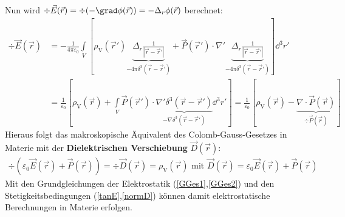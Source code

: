 		    Nun wird $\div \vec{E}(\vec{r} ) = \div (-\grad \phi(\vec{r} )) = -\Delta _r \phi(\vec{r} )$ berechnet:
		        \begin{equation}\begin{split}
				        \div \vec{E}(\vec{r} ) & = - \frac{1}{4\pi\varepsilon_0} \int\limits_V [ \rho_\text{V}(\vec{r}' ) \underbrace{\Delta _r\frac{1}{|\vec{r}  - \vec{r}'  |}}_{-4\pi\delta^3(\vec{r}  - \vec{r}' )} + \vec{P}(\vec{r}' )  \cdot \nabla'\underbrace{ \Delta _r\frac{1}{|\vec{r}  - \vec{r}'  |}}_{-4\pi\delta^3(\vec{r}  - \vec{r}' )} ] \dd^3 r'\\
				        &= \frac{1}{\varepsilon_0} [ \rho_\text{V}(\vec{r} ) + \int\limits_V \vec{P}(\vec{r}' )  \cdot \underbrace{\nabla'\delta^3(\vec{r}  - \vec{r}' )}_{-\nabla\delta^3(\vec{r}  - \vec{r}' )}  \dd^3 r' ] = \frac{1}{\varepsilon_0} [ \rho_\text{V}(\vec{r} ) - \underbrace{\nabla\cdot \vec{P}(\vec{r} )}_{\div \vec{P}(\vec{r} )} ]
			        \end{split}\end{equation}
		   Hieraus folgt das makroskopische Äquivalent des Colomb-Gauss-Gesetzes in Materie mit der \textbf{Dielektrischen Verschiebung} $\vec{D}(\vec{r} )$:
		        \begin{equation}\label{DEMat}\begin{split}
				        \div (\varepsilon_0 \vec{E}(\vec{r} ) + \vec{P}(\vec{r} ) ) = \boxed{\div \vec{D}(\vec{r} ) = \rho_\text{V}(\vec{r} )} \text{ mit } \boxed{\vec{D}(\vec{r} ) = \varepsilon_0 \vec{E}(\vec{r} ) + \vec{P}(\vec{r} )}
			        \end{split}\end{equation}
  Mit den Grundgleichungen der Elektrostatik (\ref{GGes1},\ref{GGes2}) und den Stetigkeitsbedingungen (\ref{tanE},\ref{normD}) können damit elektrostatische Berechnungen in Materie erfolgen.	 
